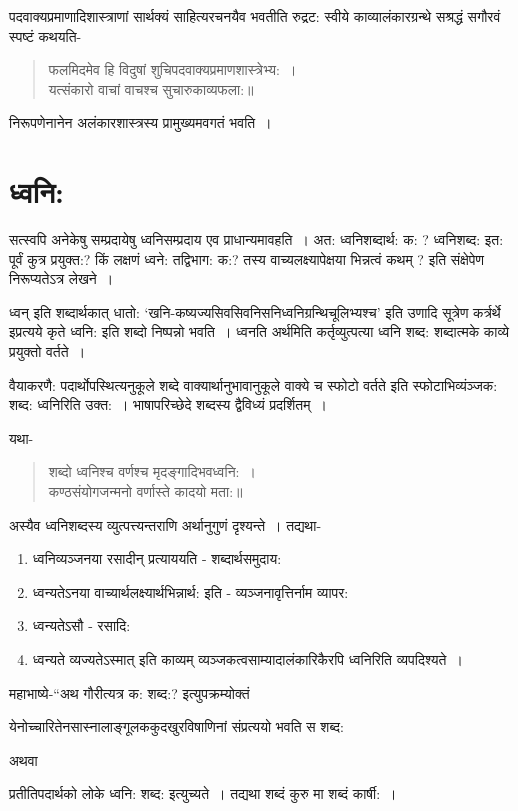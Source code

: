 {पदवाक्यप्रमाणादिशास्त्राणां सार्थक्यं साहित्यरचनयैव भवतीति रुद्रट: स्वीये काव्यालंकारग्रन्थे सश्रद्धं सगौरवं स्पष्टं कथयति-
\begin{verse}
फलमिदमेव हि विदुषां शुचिपदवाक्यप्रमाणशास्त्रेभ्य:~। \\
यत्संकारो वाचां वाचश्च सुचारुकाव्यफला:॥
\end{verse}
निरूपणेनानेन अलंकारशास्त्रस्य प्रामुख्यमवगतं भवति~। 

\section*{ध्वनि:}

सत्स्वपि अनेकेषु सम्प्रदायेषु ध्वनिसम्प्रदाय एव प्राधान्यमावहति~। अत: ध्वनिशब्दार्थ: क: ? ध्वनिशब्द: इत: पूर्वं कुत्र प्रयुक्त:? किं लक्षणं ध्वने: तद्विभाग: क:? तस्य वाच्यलक्ष्यापेक्षया भिन्नत्वं कथम् ? इति संक्षेपेण निरूप्यतेऽत्र लेखने~। 

ध्वन् इति शब्दार्थकात् धातो: ‘खनि-कष्यज्यसिवसिवनिसनिध्वनिग्रन्थिचूलिभ्यश्च’ इति उणादि सूत्रेण कर्त्रर्थे इप्रत्यये कृते ध्वनि: इति शब्दो निष्पन्नो भवति~। ध्वनति अर्थमिति कर्तृव्युत्पत्या ध्वनि शब्द: शब्दात्मके काव्ये प्रयुक्तो वर्तते~। 

वैयाकरणै: पदार्थोपस्थित्यनुकूले शब्दे वाक्यार्थानुभावानुकूले वाक्ये च स्फोटो वर्तते इति स्फोटाभिव्यंञ्जक: शब्द: ध्वनिरिति उक्त:~। भाषापरिच्छेदे शब्दस्य द्वैविध्यं प्रदर्शितम्~। 

यथा-
\begin{verse}
शब्दो ध्वनिश्च वर्णश्च मृदङ्गादिभवध्वनि:~। \\
कण्ठसंयोगजन्मनो वर्णास्ते कादयो मता:॥
\end{verse}
अस्यैव ध्वनिशब्दस्य व्युत्पत्त्यन्तराणि अर्थानुगुणं दृश्यन्ते~। तद्यथा-
\begin{enumerate}
\itemsep=0pt
\item ध्वनिव्यञ्जनया रसादीन् प्रत्याययति - शब्दार्थसमुदाय:
\item ध्वन्यतेऽनया वाच्यार्थलक्ष्यार्थभिन्नार्थ: इति - व्यञ्जनावृत्तिर्नाम व्यापर: 
\item ध्वन्यतेऽसौ - रसादि:
\item ध्वन्यते व्यज्यतेऽस्मात् इति काव्यम् व्यञ्जकत्वसाम्यादालंकारिकैरपि ध्वनिरिति व्यपदिश्यते~। 
\end{enumerate}
महाभाष्ये-“अथ गौरीत्यत्र क: शब्द:? इत्युपक्रम्योक्तं 

येनोच्चारितेनसास्नालाङ्गूलककुदखुरविषाणिनां संप्रत्ययो भवति स शब्द:

अथवा

प्रतीतिपदार्थको लोके ध्वनि: शब्द: इत्युच्यते~। तद्यथा शब्दं कुरु मा शब्दं कार्षी:~। 

}
